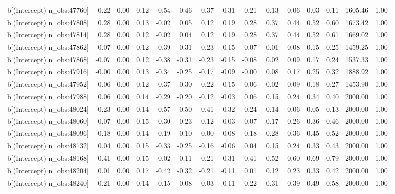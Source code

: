 \begin{table}[ht]
\begin{tabular}{rrrrrrrrrrrrrrr}
  b[(Intercept) n\_obs:47760] & -0.22 & 0.00 & 0.12 & -0.54 & -0.46 & -0.37 & -0.31 & -0.21 & -0.13 & -0.06 & 0.03 & 0.11 & 1605.46 & 1.00 \\ 
  b[(Intercept) n\_obs:47808] & 0.28 & 0.00 & 0.13 & -0.02 & 0.05 & 0.12 & 0.19 & 0.28 & 0.37 & 0.44 & 0.52 & 0.60 & 1673.42 & 1.00 \\ 
  b[(Intercept) n\_obs:47814] & 0.28 & 0.00 & 0.12 & -0.02 & 0.04 & 0.12 & 0.19 & 0.28 & 0.37 & 0.44 & 0.52 & 0.61 & 1669.02 & 1.00 \\ 
  b[(Intercept) n\_obs:47862] & -0.07 & 0.00 & 0.12 & -0.39 & -0.31 & -0.23 & -0.15 & -0.07 & 0.01 & 0.08 & 0.15 & 0.25 & 1459.25 & 1.00 \\ 
  b[(Intercept) n\_obs:47868] & -0.07 & 0.00 & 0.12 & -0.38 & -0.31 & -0.23 & -0.15 & -0.08 & 0.02 & 0.09 & 0.17 & 0.24 & 1537.33 & 1.00 \\ 
  b[(Intercept) n\_obs:47916] & -0.00 & 0.00 & 0.13 & -0.34 & -0.25 & -0.17 & -0.09 & -0.00 & 0.08 & 0.17 & 0.25 & 0.32 & 1888.92 & 1.00 \\ 
  b[(Intercept) n\_obs:47952] & -0.06 & 0.00 & 0.12 & -0.37 & -0.30 & -0.22 & -0.15 & -0.06 & 0.02 & 0.09 & 0.18 & 0.27 & 1453.90 & 1.00 \\ 
  b[(Intercept) n\_obs:47988] & 0.06 & 0.00 & 0.14 & -0.29 & -0.20 & -0.12 & -0.03 & 0.06 & 0.15 & 0.24 & 0.34 & 0.40 & 2000.00 & 1.00 \\ 
  b[(Intercept) n\_obs:48024] & -0.23 & 0.00 & 0.14 & -0.57 & -0.50 & -0.41 & -0.32 & -0.24 & -0.14 & -0.06 & 0.05 & 0.13 & 2000.00 & 1.00 \\ 
  b[(Intercept) n\_obs:48060] & 0.07 & 0.00 & 0.15 & -0.30 & -0.23 & -0.12 & -0.03 & 0.07 & 0.17 & 0.26 & 0.36 & 0.46 & 2000.00 & 1.00 \\ 
  b[(Intercept) n\_obs:48096] & 0.18 & 0.00 & 0.14 & -0.19 & -0.10 & -0.00 & 0.08 & 0.18 & 0.28 & 0.36 & 0.45 & 0.52 & 2000.00 & 1.00 \\ 
  b[(Intercept) n\_obs:48132] & 0.04 & 0.00 & 0.15 & -0.33 & -0.25 & -0.16 & -0.06 & 0.04 & 0.15 & 0.24 & 0.33 & 0.43 & 2000.00 & 1.00 \\ 
  b[(Intercept) n\_obs:48168] & 0.41 & 0.00 & 0.15 & 0.02 & 0.11 & 0.21 & 0.31 & 0.41 & 0.52 & 0.60 & 0.69 & 0.79 & 2000.00 & 1.00 \\ 
  b[(Intercept) n\_obs:48204] & 0.01 & 0.00 & 0.17 & -0.42 & -0.32 & -0.21 & -0.11 & 0.01 & 0.12 & 0.23 & 0.33 & 0.42 & 2000.00 & 1.00 \\ 
  b[(Intercept) n\_obs:48240] & 0.21 & 0.00 & 0.14 & -0.15 & -0.08 & 0.03 & 0.11 & 0.22 & 0.31 & 0.39 & 0.49 & 0.58 & 2000.00 & 1.00 \\ 

\end{tabular}
\end{table}
